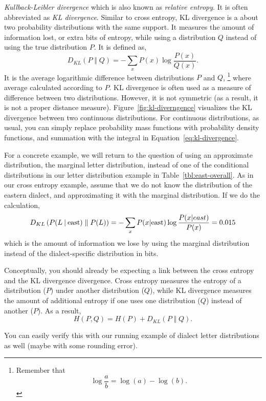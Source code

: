 \emph{Kullback-Leibler divergence} which is also known as
\emph{relative entropy}.
It is often abbreviated as \emph{KL divergence}.
Similar to cross entropy,
KL divergence is a about two probability distributions with the same support.
It measures the amount of information lost,
or extra bits of entropy,
while using a distribution $Q$ instead of using the true distribution $P$.
It is defined as,
\begin{equation}\label{eq:kl-divergence}
  D_{KL} (P\;\Vert\;Q) = - \sum_{x} P(x) \log \frac{P(x)}{Q(x)}.
\end{equation}
It is the average logarithmic difference
between distributions $P$ and $Q$,%
\footnote{%
  Remember that 
  \[
    \log \frac{a}{b} = \log(a) - \log(b) .
  \]
}
where average calculated according to $P$.
KL divergence is often used as a measure of difference
between two distributions.
However, it is not symmetric
(as a result, it is not a proper distance measure).
Figure~\ref{fig:kl-diverngence} visualizes the KL divergence
between two continuous distributions.
For continuous distributions,
as usual,
you can simply replace probability mass functions
with probability density functions, 
and summation with the integral in Equation~\ref{eq:kl-divergence}.

For a concrete example,
we will return to the question of using an approximate distribution,
the marginal letter distribution,
instead of one of the conditional distributions
in our letter distribution example in Table~\ref{tbl:east-overall}.
As in our cross entropy example,
assume that we do not know the distribution of the eastern dialect,
and approximating it with the marginal distribution.
If we do the calculation,
\[
  D_{KL} \left(P(L\given{}\text{east})\;\Vert\;P(L)\right) = - \sum_{x} P(x|\text{east}) \log \frac{P(x|east)}{P(x)}
  = \num[round-precision=3]{0.0147261}
\]
which is the amount of information we lose by using the marginal distribution
instead of the dialect-specific distribution in bits.

Conceptually,
you should already be expecting a link between 
the cross entropy and the KL divergence divergence.
Cross entropy measures the entropy of a distribution ($P$) under 
another distribution ($Q$),
while KL divergence measures the amount of additional entropy if one uses one distribution ($Q$) instead of another ($P$).
As a result,
\[
  H(P, Q) = H(P) + D_{KL}(P\;\Vert\;Q).
\]

You can easily verify this
with our running example of dialect letter distributions as well
(maybe with some rounding error).

